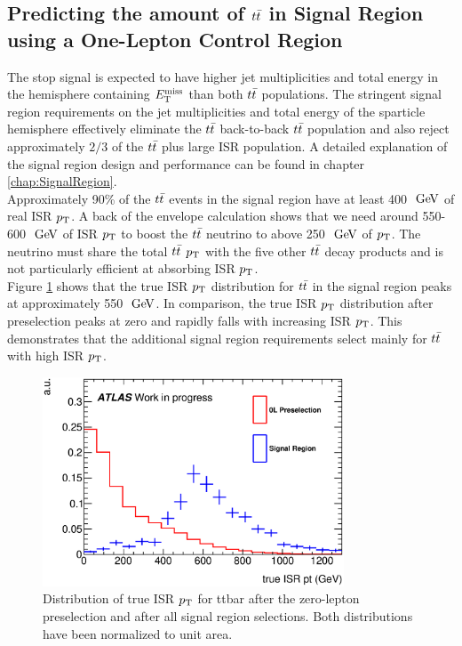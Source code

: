\subsection{Predicting the amount of $t\bar{t}$ in Signal Region using a One-Lepton Control Region}
\label{sec:Bkg:ttbar:CR}

\indent The stop signal is expected to have higher jet multiplicities and total energy in the hemisphere containing $E_{\mathrm{T}}^{\mathrm{miss}}$ than both $t\bar{t}$ populations.  The stringent signal region requirements on the jet multiplicities and total energy of the sparticle hemisphere effectively eliminate the $t\bar{t}$ back-to-back $t\bar{t}$ population and also reject approximately $2/3$ of the $t\bar{t}$ plus large ISR population.  A detailed explanation of the signal region design and performance can be found in chapter \ref{chap:SignalRegion}. \\

\indent Approximately 90\% of the $t\bar{t}$ events in the signal region have at least 400 $\gev$ of real ISR $\pt$.  A back of the envelope calculation shows that we need around 550-600 $\gev$ of ISR $\pt$ to boost the $t\bar{t}$ neutrino to above 250 $\gev$ of $\pt$.  The neutrino must share the total $t\bar{t}$ $\pt$ with the five other $t\bar{t}$ decay products and is not particularly efficient at absorbing ISR $\pt$.  \\

\indent Figure \ref{fig:ttbar:SR:trueISRpt_presel_SRC1} shows that the true ISR $\pt$ distribution for $t\bar{t}$ in the signal region peaks at approximately 550 $\gev$.  In comparison, the true ISR $\pt$ distribution after preselection peaks at zero and rapidly falls with increasing ISR $\pt$.  This demonstrates that the additional signal region requirements select mainly for $t\bar{t}$ with high ISR $\pt$.  \\

\begin{figure}[h!]
  \centering
	\includegraphics[width=0.80\textwidth]{./figures/strategy/Compare0L_truth.eps}
\caption[Distribution of true ISR $\pt$ for ttbar after the zero-lepton preselection and after all signal region selections]{Distribution of true ISR $\pt$ for ttbar after the zero-lepton preselection and after all signal region selections.  Both distributions have been normalized to unit area.}
\label{fig:ttbar:SR:trueISRpt_presel_SRC1}
\end{figure}

